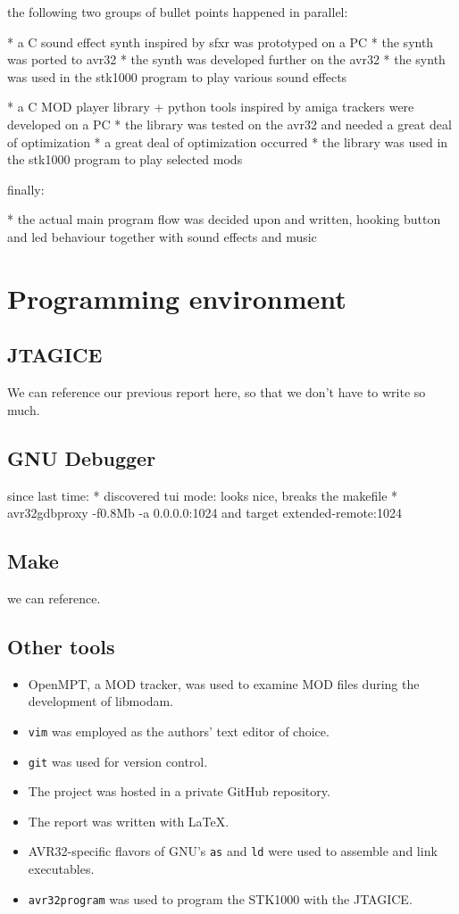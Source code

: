 the following two groups of bullet points happened in parallel:

* a C sound effect synth inspired by sfxr was prototyped on a PC
* the synth was ported to avr32
* the synth was developed further on the avr32
* the synth was used in the stk1000 program to play various sound effects

* a C MOD player library + python tools inspired by amiga trackers were developed on a PC
* the library was tested on the avr32 and needed a great deal of optimization
* a great deal of optimization occurred 
* the library was used in the stk1000 program to play selected mods


finally:

* the actual main program flow was decided upon and written, hooking button and led behaviour together with sound effects and music





\section{Programming environment}

\subsection{JTAGICE}
We can reference our previous report here, so that we don't have to write so much.

\subsection{GNU Debugger}
since last time:
* discovered tui mode: looks nice, breaks the makefile
* avr32gdbproxy -f0.8Mb -a 0.0.0.0:1024 and target extended-remote:1024

\subsection{Make}
we can reference.

\subsection{Other tools}

\begin{itemize}
\item OpenMPT, a MOD tracker, was used to examine MOD files during the development of libmodam.
\item \texttt{vim} was employed as the authors' text editor of choice.
\item \texttt{git} was used for version control.
\item The project was hosted in a private GitHub repository.
\item The report was written with \LaTeX.
\item AVR32-specific flavors of GNU's \texttt{as} and \texttt{ld} were used to assemble and link executables.
\item \texttt{avr32program} was used to program the STK1000 with the JTAGICE.
\end{itemize}

